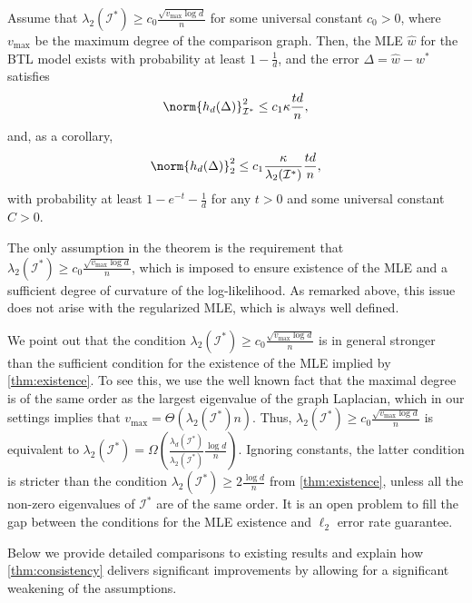 \begin{theorem} \label{thm:consistency} 
Assume that $\lambda_2(\mathcal{I}^*) \geq c_0 \frac{\sqrt{v_\text{max} \log d}}{n}$ for some universal constant $c_0 > 0$, where $v_\text{max}$ be the maximum degree of the comparison graph. Then, the MLE $\hat{w}$ for the BTL model exists with probability at least $1 - \frac{1}{d}$, and the error $\Delta = \hat{w} - w^*$ satisfies
\begin{equation}\label{eq:ell_I}
    \norm{h_d(\Delta)}_{\mathcal{I}^*}^2 \leq c_1 \kappa \frac{td}{n},
\end{equation}
and, as a corollary,
\begin{equation}\label{eq:ell_2_alt}
    \norm{h_d(\Delta)}_2^2 \leq c_1 \frac{\kappa}{\lambda_2(\mathcal{I}^*)} \frac{td}{n},
\end{equation}
with probability at least $1 - e^{-t} - \frac{1}{d}$ for any $t>0$ and some universal constant $C > 0$.
\end{theorem}

The only assumption in the theorem is the requirement that
$\lambda_2(\mathcal{I}^*) \geq c_0 \frac{\sqrt{v_\text{max} \log d}}{n}$, which is imposed to ensure existence of the MLE and a sufficient degree of curvature of the log-likelihood. As remarked above, this issue does not arise with the regularized MLE, which is always well defined. 

We point out that the condition $\lambda_2(\mathcal{I}^*) \geq c_0 \frac{\sqrt{ v_\text{max} \log d}}{n} $ is in general stronger than the sufficient condition for the existence of the MLE implied by \ref{thm:existence}. To see this, we use the well known fact that the maximal degree is of the same order as the largest eigenvalue of the graph Laplacian, which in our settings implies that $ v_\text{max}  = \Theta(\lambda_2(\mathcal{I}^*) n)$. Thus,  $\lambda_2(\mathcal{I}^*) \geq c_0 \frac{\sqrt{  v_\text{max} \log d}}{n} $ is equivalent to $\lambda_2(\mathcal{I}^*) = \Omega( \frac{\lambda_{d}(\mathcal{I}^*)}{\lambda_2(\mathcal{I}^*)}\frac{ \log d}{n})$. Ignoring constants, the latter condition is stricter than the condition $\lambda_2(\mathcal{I}^*) \geq 2\frac{\log d}{n}$ from \ref{thm:existence}, unless all the non-zero eigenvalues of $\mathcal{I}^*$
are of the same order. It is an open problem to fill the gap between the conditions for the MLE existence and $\ell_2$ error rate guarantee.

Below we provide detailed comparisons to existing results and explain how \ref{thm:consistency} delivers significant improvements by allowing for a significant weakening of the assumptions. 

